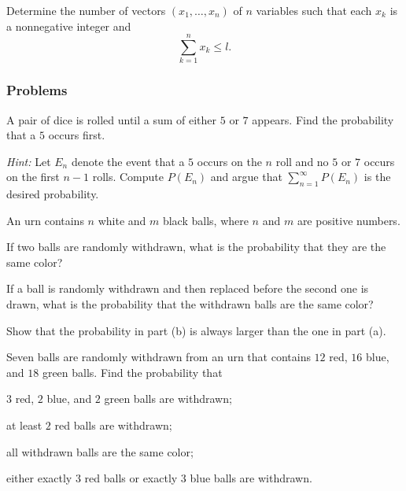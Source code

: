 \begin{problem}[Ross, \S 1, \# 23]
  Determine the number of vectors \((x_1,\dotsc,x_n)\) of \(n\) variables
  such that each \(x_k\) is a nonnegative integer and
  \[
    \sum_{k=1}^n x_k\leq l.
  \]
\end{problem}
\begin{solution*}
\end{solution*}

\subsubsection{Problems}
\begin{problem}[Ross, \S 2, \# 25]
  A pair of dice is rolled until a sum of either \(5\) or \(7\)
  appears. Find the probability that a \(5\) occurs first.

  \noindent\emph{Hint:} Let \(E_n\)
  denote the event that a \(5\) occurs on the \(n\) roll and no
  \(5\) or \(7\) occurs on the first \(n-1\) rolls. Compute \(P(E_n)\) and
  argue that \(\sum_{n=1}^\infty P(E_n)\) is the desired probability.
\end{problem}
\begin{solution*}
\end{solution*}

\begin{problem}[Ross, \S 2, \# 29]
  An urn contains \(n\) white and \(m\) black balls, where \(n\) and \(m\)
  are positive numbers.
  \begin{alphlist}
  \item If two balls are randomly withdrawn, what is the probability that
    they are the same color?
  \item If a ball is randomly withdrawn and then replaced before the second
    one is drawn, what is the probability that the withdrawn balls are the
    same color?
  \item Show that the probability in part (b) is always larger than the one
    in part (a).
  \end{alphlist}
  \end{problem}
\begin{solution*}
\end{solution*}

\begin{problem}[Ross, \S 2, \# 35]
  Seven balls are randomly withdrawn from an urn that contains \(12\) red,
  \(16\) blue, and \(18\) green balls. Find the probability that
  \begin{alphlist}
  \item \(3\) red, \(2\) blue, and \(2\) green balls are withdrawn;
  \item at least \(2\) red balls are withdrawn;
  \item all withdrawn balls are the same color;
  \item either exactly \(3\) red balls or exactly \(3\) blue balls are
    withdrawn.
  \end{alphlist}
\end{problem}
\begin{solution*}
\end{solution*}


